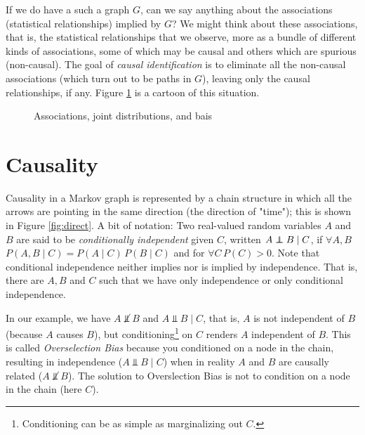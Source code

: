\documentclass[11pt, oneside]{article}   	%
\newcommand\independent{\protect\mathpalette{\protect\independenT}{\perp}}
\def\independenT#1#2{\mathrel{\rlap{$#1#2$}\mkern2mu{#1#2}}}
\begin{document}
\bigskip
\noindent
If we do have a such a graph $G$,  can we say anything about the associations (statistical relationships) implied by $G$?
We might think about these associations, that is, the statistical relationships that we observe, more as a bundle of different kinds of associations, 
some of which may be causal and others which are spurious (non-causal). The goal of \emph{causal identification} is to 
eliminate all the non-causal associations (which turn out to  be paths in $G$), leaving only the causal relationships, if any. Figure \ref{fig:associations}
is a cartoon of this situation.


\begin{figure}[h!]
\caption{Associations, joint distributions, and bais}
\label{fig:associations}
\end{figure}

\section{Causality}
 Causality in a Markov graph is represented by a chain structure in which all the arrows are pointing in the same direction (the direction of "time"); 
 this is shown in Figure \ref{fig:direct}. A bit of notation: Two real-valued random variables $A$ and $B$ are said to be \emph{conditionally independent}
 given $C$, written $A \independent B \mid C$, if $\forall A,B$ $P(A, B \mid C) = P(A \mid C) \, P(B \mid C)$ and for $\forall C \, P(C) > 0$. Note that conditional 
 independence neither implies nor is implied by independence. That is,  there are $A,B$ and $C$ such that we have only independence or only conditional independence.
 
\bigskip
\noindent
In our example, we have  $A \not \Vbar B$ and $A \Vbar B \mid C$, that is, $A$ is not independent of $B$ (because $A$ causes $B$),
but conditioning\footnote{Conditioning can be as simple as marginalizing out $C$.}  on $C$ renders $A$ independent of $B$.  
This is called \emph{Overselection Bias} because you conditioned on a node in the chain, resulting in independence ($A \Vbar B \mid C$) when 
in reality $A$ and $B$ are causally related ($A \not \Vbar B$). The solution to Overslection Bias
is not to condition on a node in the chain (here $C$).
\end{document}
